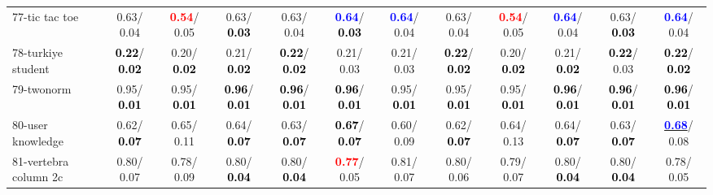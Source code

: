 \begin{table}[h]
\begin{center}
{\begin{tabular}{lc|c|c|c|c|c|c|c|c|c|c}
77-tic tac toe &   0.63/  0.04 & \textcolor{red}{\textbf{  0.54}}/  0.05 &   0.63/\textcolor{black}{\textbf{  0.03}} &   0.63/  0.04 & \textcolor{blue}{\textbf{  0.64}}/\textcolor{black}{\textbf{  0.03}} & \textcolor{blue}{\textbf{  0.64}}/  0.04 &   0.63/  0.04 & \textcolor{red}{\textbf{  0.54}}/  0.05 & \textcolor{blue}{\textbf{  0.64}}/  0.04 &   0.63/\textcolor{black}{\textbf{  0.03}} & \textcolor{blue}{\textbf{  0.64}}/  0.04 \\
78-turkiye student & \textcolor{black}{\textbf{  0.22}}/\textcolor{black}{\textbf{  0.02}} &   0.20/\textcolor{black}{\textbf{  0.02}} &   0.21/\textcolor{black}{\textbf{  0.02}} & \textcolor{black}{\textbf{  0.22}}/\textcolor{black}{\textbf{  0.02}} &   0.21/  0.03 &   0.21/  0.03 & \textcolor{black}{\textbf{  0.22}}/\textcolor{black}{\textbf{  0.02}} &   0.20/\textcolor{black}{\textbf{  0.02}} &   0.21/\textcolor{black}{\textbf{  0.02}} & \textcolor{black}{\textbf{  0.22}}/  0.03 & \textcolor{black}{\textbf{  0.22}}/\textcolor{black}{\textbf{  0.02}} \\ \hline
79-twonorm &   0.95/\textcolor{black}{\textbf{  0.01}} &   0.95/\textcolor{black}{\textbf{  0.01}} & \textcolor{black}{\textbf{  0.96}}/\textcolor{black}{\textbf{  0.01}} & \textcolor{black}{\textbf{  0.96}}/\textcolor{black}{\textbf{  0.01}} & \textcolor{black}{\textbf{  0.96}}/\textcolor{black}{\textbf{  0.01}} &   0.95/\textcolor{black}{\textbf{  0.01}} &   0.95/\textcolor{black}{\textbf{  0.01}} &   0.95/\textcolor{black}{\textbf{  0.01}} & \textcolor{black}{\textbf{  0.96}}/\textcolor{black}{\textbf{  0.01}} & \textcolor{black}{\textbf{  0.96}}/\textcolor{black}{\textbf{  0.01}} & \textcolor{black}{\textbf{  0.96}}/\textcolor{black}{\textbf{  0.01}} \\
80-user knowledge &   0.62/\textcolor{black}{\textbf{  0.07}} &   0.65/  0.11 &   0.64/\textcolor{black}{\textbf{  0.07}} &   0.63/\textcolor{black}{\textbf{  0.07}} & \textcolor{black}{\textbf{  0.67}}/\textcolor{black}{\textbf{  0.07}} &   0.60/  0.09 &   0.62/\textcolor{black}{\textbf{  0.07}} &   0.64/  0.13 &   0.64/\textcolor{black}{\textbf{  0.07}} &   0.63/\textcolor{black}{\textbf{  0.07}} & \underline{\textcolor{blue}{\textbf{  0.68}}}/  0.08 \\
81-vertebra column 2c &   0.80/  0.07 &   0.78/  0.09 &   0.80/\textcolor{black}{\textbf{  0.04}} &   0.80/\textcolor{black}{\textbf{  0.04}} & \textcolor{red}{\textbf{  0.77}}/  0.05 &   0.81/  0.07 &   0.80/  0.06 &   0.79/  0.07 &   0.80/\textcolor{black}{\textbf{  0.04}} &   0.80/\textcolor{black}{\textbf{  0.04}} &   0.78/  0.05 \\

\end{tabular}}
\end{center}
\end{table}
